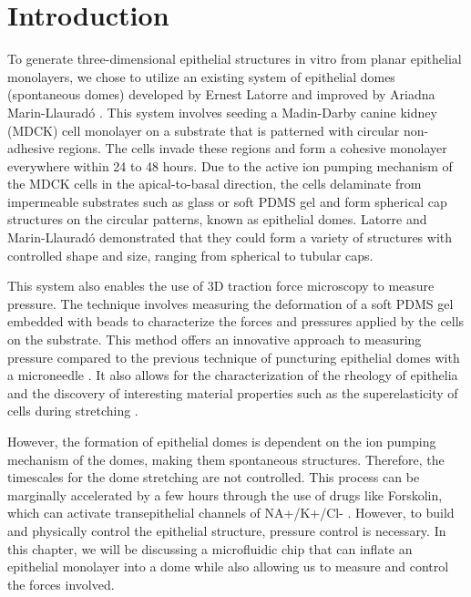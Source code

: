 \hypertarget{introduction}{%
\section{Introduction}\label{introduction1}}

To generate three-dimensional epithelial structures in vitro from planar epithelial monolayers, we chose to utilize an existing system of epithelial domes (spontaneous domes) developed by Ernest Latorre and improved by Ariadna Marin-Llauradó  \cite{latorre2018,marin-llaurado2022}. This system involves seeding a Madin-Darby canine kidney (MDCK) cell monolayer on a substrate that is patterned with circular non-adhesive regions. The cells invade these regions and form a cohesive monolayer everywhere within 24 to 48 hours. Due to the active ion pumping mechanism of the MDCK cells in the apical-to-basal direction, the cells delaminate from impermeable substrates such as glass or soft PDMS gel and form spherical cap structures on the circular patterns, known as epithelial domes. Latorre and Marin-Llauradó demonstrated that they could form a variety of structures with controlled shape and size, ranging from spherical to tubular caps.  

This system also enables the use of 3D traction force microscopy to measure pressure. The technique involves measuring the deformation of a soft PDMS gel embedded with beads to characterize the forces and pressures applied by the cells on the substrate. This method offers an innovative approach to measuring pressure compared to the previous technique of puncturing epithelial domes with a microneedle \cite{tanner1983, choudhury2022}. It also allows for the characterization of the rheology of epithelia and the discovery of interesting material properties such as the superelasticity of cells during stretching \cite{latorre2018}.  

However, the formation of epithelial domes is dependent on the ion pumping mechanism of the domes, making them spontaneous structures. Therefore, the timescales for the dome stretching are not controlled. This process can be marginally accelerated by a few hours through the use of drugs like Forskolin, which can activate transepithelial channels of NA+/K+/Cl- \cite{klebe1995,bourke1987}. However, to build and physically control the epithelial structure, pressure control is necessary. In this chapter, we will be discussing a microfluidic chip that can inflate an epithelial monolayer into a dome while also allowing us to measure and control the forces involved.


